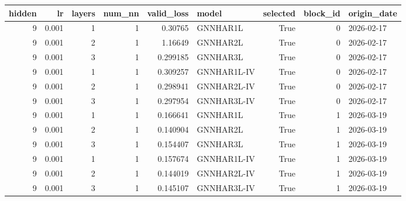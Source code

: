 \begin{tabular}{rrrrrlrrl}
\toprule
hidden & lr & layers & num_nn & valid_loss & model & selected & block_id & origin_date \\
\midrule
9 & 0.001 & 1 & 1 & 0.30765 & GNNHAR1L & True & 0 & 2026-02-17 \\
9 & 0.001 & 2 & 1 & 1.16649 & GNNHAR2L & True & 0 & 2026-02-17 \\
9 & 0.001 & 3 & 1 & 0.299185 & GNNHAR3L & True & 0 & 2026-02-17 \\
9 & 0.001 & 1 & 1 & 0.309257 & GNNHAR1L-IV & True & 0 & 2026-02-17 \\
9 & 0.001 & 2 & 1 & 0.298941 & GNNHAR2L-IV & True & 0 & 2026-02-17 \\
9 & 0.001 & 3 & 1 & 0.297954 & GNNHAR3L-IV & True & 0 & 2026-02-17 \\
9 & 0.001 & 1 & 1 & 0.166641 & GNNHAR1L & True & 1 & 2026-03-19 \\
9 & 0.001 & 2 & 1 & 0.140904 & GNNHAR2L & True & 1 & 2026-03-19 \\
9 & 0.001 & 3 & 1 & 0.154407 & GNNHAR3L & True & 1 & 2026-03-19 \\
9 & 0.001 & 1 & 1 & 0.157674 & GNNHAR1L-IV & True & 1 & 2026-03-19 \\
9 & 0.001 & 2 & 1 & 0.144019 & GNNHAR2L-IV & True & 1 & 2026-03-19 \\
9 & 0.001 & 3 & 1 & 0.145107 & GNNHAR3L-IV & True & 1 & 2026-03-19 \\
\bottomrule
\end{tabular}
